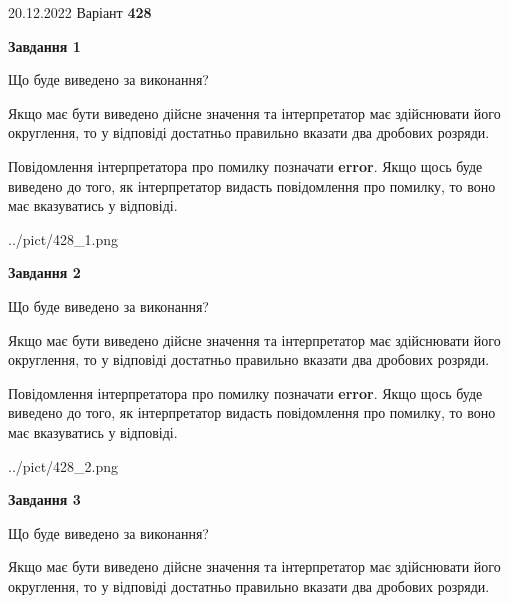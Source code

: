 \documentclass[12pt, ukrainian]{article}
\begin{document}
{20.12.2022 Варіант \No \textbf { 428 }\par}
{
\begin {Large}

{\begin {center}\textbf{Завдання 1}\end {center}}\par
Що буде виведено за виконання? \par

Якщо має бути виведено дійсне значення та інтерпретатор має здійснювати його округлення, 
то у відповіді достатньо правильно вказати два дробових розряди.

Повідомлення інтерпретатора про помилку позначати \textbf{error}.
Якщо щось буде виведено до того, як інтерпретатор видасть повідомлення про помилку, 
то воно має вказуватись у відповіді. \par

\begin{center}
	{../pict/428_1.png}
\end{center}
\newpage

{\begin {center}\textbf{Завдання 2}\end {center}}\par
Що буде виведено за виконання? \par

Якщо має бути виведено дійсне значення та інтерпретатор має здійснювати його округлення, 
то у відповіді достатньо правильно вказати два дробових розряди.

Повідомлення інтерпретатора про помилку позначати \textbf{error}.
Якщо щось буде виведено до того, як інтерпретатор видасть повідомлення про помилку, 
то воно має вказуватись у відповіді. \par

\begin{center}
	{../pict/428_2.png}
\end{center}
\newpage

{\begin {center}\textbf{Завдання 3}\end {center}}\par
Що буде виведено за виконання? \par

Якщо має бути виведено дійсне значення та інтерпретатор має здійснювати його округлення, 
то у відповіді достатньо правильно вказати два дробових розряди.


\end{Large}}
\end{document}
